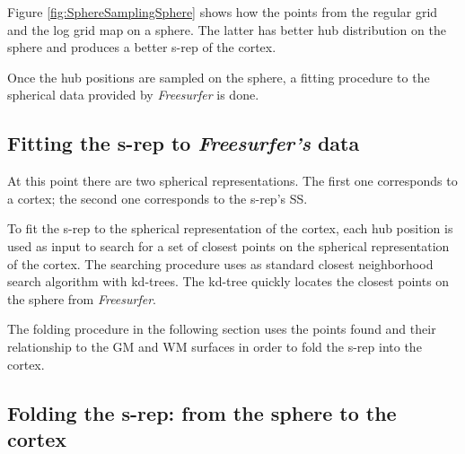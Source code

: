 \documentclass[a4paper,twoside]{article}
\begin{document}
Figure \ref{fig:SphereSamplingSphere} shows how the points from the regular grid and the log grid map 
on a sphere. The latter has better hub distribution on the sphere and produces a better s-rep of the cortex. 

Once the hub positions are sampled on the sphere, a fitting procedure to the spherical data provided by \textit{Freesurfer} is done.

\subsection{Fitting the s-rep to \textit{Freesurfer's} data}

At this point there are two spherical representations. 
The first one corresponds to a cortex;
the second one corresponds to the s-rep's SS.

To fit the s-rep to the spherical representation of the cortex,
each hub position is used as input to search for a set of closest points on 
the spherical representation of the cortex.
The searching procedure uses as standard closest neighborhood search algorithm 
with kd-trees. The kd-tree quickly locates the closest points on the sphere from \textit{Freesurfer}.

The folding procedure in the following section uses the points found
and their relationship to the GM and WM surfaces in order to fold the s-rep into the cortex.

\subsection{Folding the s-rep: from the sphere to the cortex}

\end{document}
